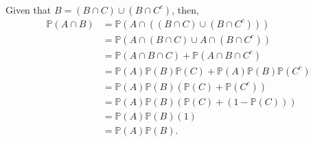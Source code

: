 \documentclass[letterpaper,12pt,addpoints]{exam}
\begin{document}
\begin{questions}
\begin{parts}
\begin{solution}\\
Given that $B=(B\cap C)\cup(B\cap C^c)$, then,
\begin{align*}
    \mathbb{P}(A\cap B) &= \mathbb{P}(A\cap ((B\cap C)\cup(B\cap C^c)))\\
    &= \mathbb{P}(A\cap (B\cap C) \cup A\cap (B\cap C^c))\\
    &= \mathbb{P}(A\cap B\cap C) + \mathbb{P}(A\cap B\cap C^c)\\
    &= \mathbb{P}(A)\mathbb{P}(B)\mathbb{P}(C) + \mathbb{P}(A)\mathbb{P}(B)\mathbb{P}(C^c)\\
    &= \mathbb{P}(A)\mathbb{P}(B)(\mathbb{P}(C)+\mathbb{P}(C^c))\\
    &= \mathbb{P}(A)\mathbb{P}(B)(\mathbb{P}(C) + (1-\mathbb{P}(C)))\\
    &=\mathbb{P}(A)\mathbb{P}(B)(1)\\
    &= \mathbb{P}(A)\mathbb{P}(B).
\end{align*}
\end{solution}
\vspace*{\fill}\eject


\end{parts}
\end{questions}
\end{document}

